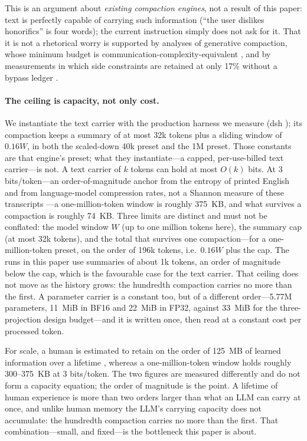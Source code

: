 \documentclass[sigconf,nonacm]{acmart}
\begin{document}
This is an argument about \emph{existing compaction engines}, not a result of this paper: text is
perfectly capable of carrying such information (``the user dislikes honorifics'' is four words); the
current instruction simply does not ask for it. That it is not
a rhetorical worry is supported by analyses of generative compaction, whose minimum budget is
communication-complexity-equivalent \cite{compacttheory2026}, and by measurements in which side
constraints are retained at only 17\% without a bypass ledger \cite{lostincompact2026}.

\paragraph{The ceiling is capacity, not only cost.} We instantiate the text carrier with the production
harness we measure (dsh \cite{dsh}); its compaction keeps a summary of at most 32k tokens plus a sliding
window of $0.16W$, in both the scaled-down 40k preset and the 1M preset. Those constants are that engine's
preset; what they instantiate---a capped, per-use-billed text carrier---is not. A text carrier of $k$ tokens can hold at most $O(k)$
bits. At 3 bits/token---an order-of-magnitude anchor from the entropy of printed English and from language-model
compression rates, not a Shannon measure of these transcripts \cite{shannon1951,deletang2024}---a
one-million-token window is roughly 375~KB, and what survives a compaction is roughly 74~KB. Three limits are
distinct and must not be conflated: the model window $W$ (up to one million tokens here), the summary cap (at
most 32k tokens), and the total that survives one compaction---for a one-million-token preset, on the order of
196k tokens, i.e.\ $0.16W$ plus the cap. The runs in this paper use summaries of about 1k tokens, an order of
magnitude below the cap, which is the favourable case for the text carrier. That ceiling does
not move as the history grows: the hundredth
compaction carries no more than the first. A parameter carrier is a constant too, but of a different
order---5.77M parameters, 11~MiB in BF16 and 22~MiB in FP32, against 33~MiB for the three-projection design
budget---and it is written once, then read at a constant cost per processed token.

For scale, a human is estimated to retain on the order of 125~MB of learned information over a lifetime
\cite{landauer1986}, whereas a one-million-token window holds roughly 300--375~KB at 3 bits/token. The two
figures are measured differently and do not form a capacity equation; the order of magnitude is the point. A
lifetime of human experience is more than two orders larger than what an LLM can carry at once, and unlike human
memory the LLM's carrying capacity does not accumulate: the hundredth compaction carries no more than the
first. That combination---small, and fixed---is the bottleneck this paper is about.
\end{document}
